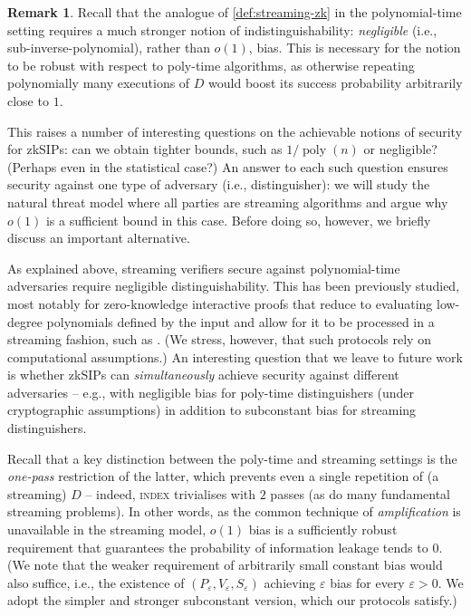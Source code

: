 \documentclass[a4paper,UKenglish,cleveref, autoref, thm-restate]{lipics-v2021}
\theoremstyle{definition}
\newtheorem{remark}[theorem]{Remark}
\newcommand{\zksip}{\textrm{zkSIP}}
\newcommand{\poly}{\operatorname{poly}}
\newcommand{\eps}{\varepsilon}
\newcommand{\indexproblem}{\normalfont\textsc{index}\xspace}
\begin{document}
\begin{remark}
\label{rem:subconstant-bias}
    Recall that the analogue of \cref{def:streaming-zk} in the polynomial-time setting requires a much stronger notion of indistinguishability: \emph{negligible} (i.e., sub-inverse-polynomial), rather than $o(1)$, bias. This is necessary for the notion to be robust with respect to poly-time algorithms, as otherwise repeating polynomially many executions of $D$ would boost its success probability arbitrarily close to $1$.
    
    This raises a number of interesting questions on the achievable notions of security for \zksip{}s: can we obtain tighter bounds, such as $1/\poly(n)$ or negligible? (Perhaps even in the statistical case?) An answer to each such question ensures security against one type of adversary (i.e., distinguisher): we will study the natural threat model where all parties are streaming algorithms and argue why $o(1)$ is a sufficient bound in this case. Before doing so, however, we briefly discuss an important alternative.
    
    As explained above, streaming verifiers secure against polynomial-time adversaries require negligible distinguishability. This has been previously studied, most notably for zero-knowledge interactive proofs that reduce to evaluating low-degree polynomials defined by the input and allow for it to be processed in a streaming fashion, such as \cite{GKR08}. (We stress, however, that such protocols rely on computational assumptions.) An interesting question that we leave to future work is whether \zksip{}s can \emph{simultaneously} achieve security against different adversaries -- e.g., with negligible bias for poly-time distinguishers (under cryptographic assumptions) in addition to subconstant bias for streaming distinguishers.
    
    Recall that a key distinction between the poly-time and streaming settings is the \emph{one-pass} restriction of the latter, which prevents even a single repetition of (a streaming) $D$ -- indeed, \indexproblem trivialises with $2$ passes (as do many fundamental streaming problems). In other words, as the common technique of \emph{amplification} is unavailable in the streaming model, $o(1)$ bias is a sufficiently robust requirement that guarantees the probability of information leakage tends to $0$. (We note that the weaker requirement of arbitrarily small constant bias would also suffice, i.e., the existence of $(P_\eps, V_\eps, S_\eps)$ achieving $\eps$ bias for every $\eps > 0$. We adopt the simpler and stronger subconstant version, which our protocols satisfy.)
    
\end{remark}
\end{document}
